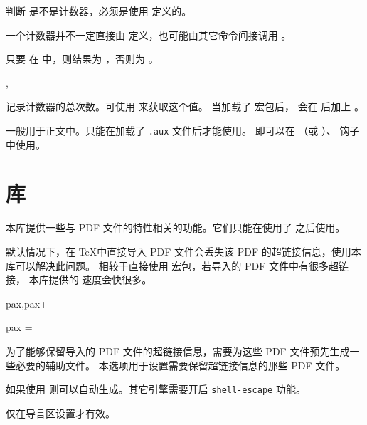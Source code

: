 \documentclass{whudoc}
\begin{document}
\begin{function}{\IfIsCounterTF}
  \begin{syntax}
    \V\IfIsCounterTF {}  
  \end{syntax}
判断  是不是计数器，必须是使用  定义的。

\begin{texnote}
一个计数器并不一定直接由  定义，也可能由其它命令间接调用 。

只要  在  中，则结果为 ，否则为 。
\end{texnote}
\end{function}

\begin{function}{\RecordTotalCounters,\IfRecordTotalCounterTF}
  \begin{syntax}
    \V\RecordTotalCounters {}
    \V\IfRecordTotalCounterTF {}  
  \end{syntax}
记录计数器的总次数。可使用  来获取这个值。
当加载了  宏包后， 会在  后加上 。

 一般用于正文中。只能在加载了 \texttt{.aux} 文件后才能使用。
即可以在 （或 ）、 钩子中使用。
\end{function}


\section{库}

本库提供一些与 PDF 文件的特性相关的功能。它们只能在使用了 
 之后使用。

默认情况下，在 \TeX 中直接导入 PDF 文件会丢失该 PDF 的超链接信息，使用本库可以解决此问题。
相较于直接使用  宏包，若导入的 PDF 文件中有很多超链接，
本库提供的  速度会快很多。

\begin{keyval}[path=pdf]{pax,pax+}
  \begin{syntax}
    pax = 
  \end{syntax}
为了能够保留导入的 PDF 文件的超链接信息，需要为这些 PDF 文件预先生成一些必要的辅助文件。
本选项用于设置需要保留超链接信息的那些 PDF 文件。

如果使用 \LuaLaTeX 则可以自动生成。其它引擎需要开启 \texttt{shell-escape} 功能。

仅在导言区设置才有效。
\end{keyval}
\end{document}
